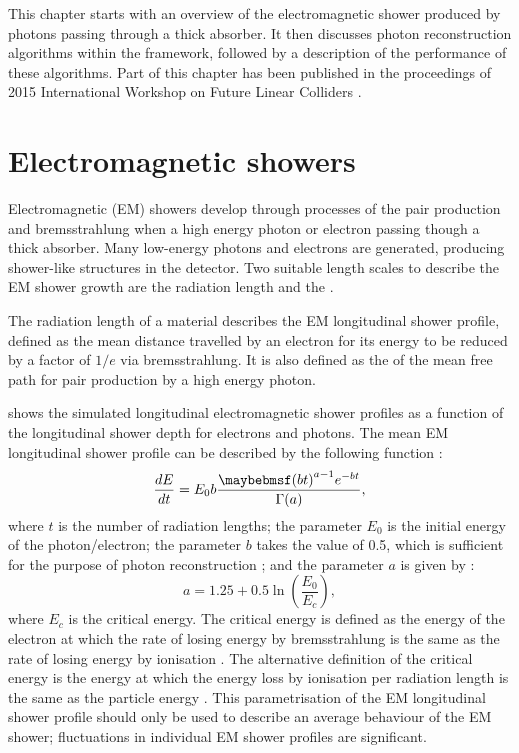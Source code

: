 This chapter starts with an overview of the electromagnetic shower produced by photons passing through a thick absorber. It then discusses photon reconstruction algorithms within the \pandora framework, followed by a description of the performance of these algorithms.  Part of this chapter has been published in the proceedings of 2015 International Workshop on Future Linear Colliders \cite{Xu:2016rcz}.




\section{Electromagnetic showers}
\label{sec:photonEMshower}
Electromagnetic (EM) showers develop through processes of the pair production and bremsstrahlung when a high energy photon or electron passing though a thick absorber. Many low-energy photons and electrons are generated, producing shower-like  structures in the detector. Two suitable length scales to describe the EM shower growth are the radiation length and the \RM \cite{PhysRev.149.201,Bathow:1970dn}.

The radiation length of a material describes the EM longitudinal  shower profile, defined as the mean distance travelled by an electron for  its energy to be reduced by a factor of $1/e$ via bremsstrahlung. It is also defined as the  of the mean free path  for pair production by a high energy photon\cite{segre1977nuclei}.


 shows the simulated longitudinal electromagnetic shower profiles as a function of the longitudinal shower depth for electrons and photons. The mean EM longitudinal shower profile can be described by the following function \cite{Longo:1975wb}:
\begin{equation}
\frac{dE}{dt} = E_0 b \frac{\parenths{bt}^{a-1}e^{-bt}}{\Gamma(a)},
\label{eq:photonEMshower}
\end{equation}
where $t$ is the number of radiation lengths; the parameter $E_0$ is the initial energy of the photon/electron; the parameter $b$ takes the value of 0.5, which is sufficient for the purpose of photon reconstruction \cite{Agashe:2014kda}; and the parameter $a$ is given by \cite{Thomson:2009rp}:
\begin{equation}
a = 1.25 + 0.5\ln\left(\frac{E_0}{E_c}\right),
\end{equation}
where $E_c$ is the critical energy. The critical energy is defined as the energy of the electron at which the rate of losing energy by bremsstrahlung is the same as the rate of losing energy by ionisation \cite{1964NASSP3012.....B}. The alternative definition of the critical energy is the energy at which the energy loss by ionisation per radiation length is the same as the particle energy \cite{rossi1952high}. This parametrisation of the EM longitudinal shower profile should only be used to describe an average behaviour of the EM shower; fluctuations in individual EM shower profiles are significant.

